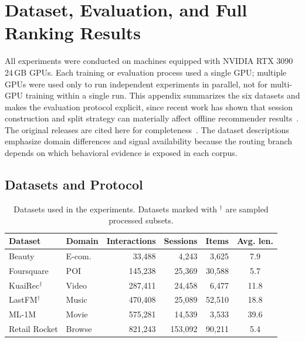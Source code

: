 \documentclass[sigconf,review,anonymous]{acmart}
\begin{document}
\section{Dataset, Evaluation, and Full Ranking Results}

All experiments were conducted on machines equipped with NVIDIA RTX 3090 24\,GB GPUs. Each training or evaluation process used a single GPU; multiple GPUs were used only to run independent experiments in parallel, not for multi-GPU training within a single run.
\label{app:data-details}
This appendix summarizes the six datasets and makes the evaluation protocol explicit, since recent work has shown that session construction and split strategy can materially affect offline recommender results~\cite{ji2023leakage,gusak2025timesplit}. The original releases are cited here for completeness~\cite{mcauley2015amazon,yang2015foursquare,gao2022kuairec,celma2010music,harper2015movielens,retailrocket2015dataset}. The dataset descriptions emphasize domain differences and signal availability because the routing branch depends on which behavioral evidence is exposed in each corpus.

\subsection{Datasets and Protocol}

\begin{table}[H]
  \caption{Datasets used in the experiments. Datasets marked with $^\dagger$ are sampled processed subsets.}
  \label{tab:appendix-datasets}
  \centering
  \footnotesize
  \setlength{\tabcolsep}{3.0pt}
  \begin{tabular*}{\columnwidth}{@{\extracolsep{\fill}}llrrrc@{}}
    \toprule
    Dataset & Domain & Interactions & Sessions & Items & Avg. len. \\
    \midrule
    Beauty & E-com. & 33,488 & 4,243 & 3,625 & 7.9 \\
    Foursquare & POI & 145,238 & 25,369 & 30,588 & 5.7 \\
    KuaiRec$^\dagger$ & Video & 287,411 & 24,458 & 6,477 & 11.8 \\
    LastFM$^\dagger$ & Music & 470,408 & 25,089 & 52,510 & 18.8 \\
    ML-1M & Movie & 575,281 & 14,539 & 3,533 & 39.6 \\
    Retail Rocket & Browse & 821,243 & 153,092 & 90,211 & 5.4 \\
    \bottomrule
  \end{tabular*}
\end{table}
\end{document}
